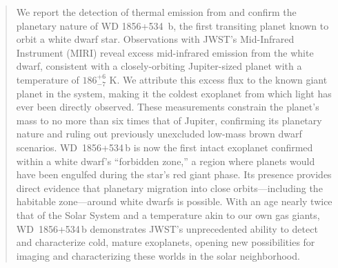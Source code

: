 \documentclass[twocolumn]{aastex631}
\begin{document}
\author[0000-0001-6050-7645]{David K. Sing}

\author[0000-0003-3987-3776]{Christopher O'Connor}

\author[0000-0002-8400-1646]{Alexander Venner}

\author[0000-0002-8808-4282]{Siyi Xu}



\begin{abstract}
We report the detection of thermal emission from and confirm the planetary nature of WD 1856+534~b, the first transiting planet known to orbit a white dwarf star. Observations with JWST’s Mid-Infrared Instrument (MIRI) reveal excess mid-infrared emission from the white dwarf, consistent with a closely-orbiting Jupiter-sized planet with a temperature of $186^{+6}_{-7}$ K. We attribute this excess flux to the known {giant} planet in the system, making it the coldest exoplanet from which light has ever been directly observed. These measurements constrain the planet’s mass to no more than six times that of Jupiter, confirming its planetary nature and ruling out previously unexcluded low-mass brown dwarf scenarios.
WD~1856+534\,b is now the first intact exoplanet confirmed within a white dwarf’s “forbidden zone,” a region where planets would have been engulfed during the star’s red giant phase. Its presence provides direct evidence that planetary migration into close orbits—including the habitable zone—around white dwarfs is possible. With an age nearly twice that of the Solar System and a temperature akin to our own gas giants, WD~1856+534\,b demonstrates JWST’s unprecedented ability to detect and characterize cold, mature exoplanets, opening new possibilities for imaging and characterizing these worlds in the solar neighborhood.






\end{abstract}
\end{document}
